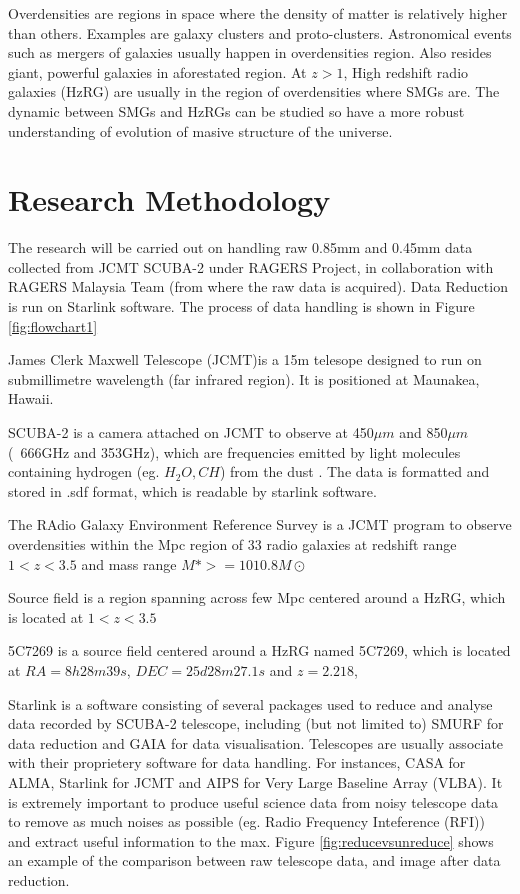 \documentclass{article}
\begin{document}
\noindent Overdensities are regions in space where the density of matter is relatively higher than others. Examples are galaxy clusters and proto-clusters. Astronomical events such as mergers of galaxies usually happen in overdensities region. Also resides giant, powerful galaxies in aforestated region. At $z>1$, High redshift radio galaxies (HzRG) are usually in the region of overdensities where SMGs are. The dynamic between SMGs and HzRGs can be studied so have a more robust understanding of evolution of masive structure of the universe.\parencite{Saxena2018}

\section{Research Methodology}

The research will be carried out on handling raw 0.85mm and 0.45mm data collected from JCMT SCUBA-2 under RAGERS Project, in collaboration with RAGERS Malaysia Team (from where the raw data is acquired). Data Reduction is run on Starlink software. The process of data handling is shown in Figure \ref{fig:flowchart1}
\medskip

\noindent James Clerk Maxwell Telescope (JCMT)is a 15m telesope designed to run on submillimetre wavelength (far infrared region). It is positioned at Maunakea, Hawaii.
\medskip

\noindent SCUBA-2 is a camera attached on JCMT to observe at 450$\mu m$ and 850$\mu m$ (~666GHz and 353GHz), which are frequencies emitted by light molecules containing hydrogen (eg. $H_2O,CH$) from the dust \parencite{Phillips2013}. The data is formatted and stored in .sdf format, which is readable by starlink software.
\medskip

\noindent The RAdio Galaxy Environment Reference Survey is a JCMT program to observe overdensities within the Mpc region of 33 radio galaxies at redshift range $1 < z < 3.5$ and mass range $M\ast >=1010.8M\odot $ \parencite{Ragers2021}
\medskip

\noindent Source field is a region spanning across few Mpc centered around a HzRG, which is located at $1 < z < 3.5$ 
\medskip

\noindent 5C7269 is a source field centered around a HzRG named 5C7269, which is located at $RA = 8h28m39s$, $DEC = 25d28m27.1s$ and $z = 2.218$, 
\medskip

\noindent Starlink is a software consisting of several packages used to reduce and analyse data recorded by SCUBA-2 telescope, including (but not limited to) SMURF for data reduction and GAIA for data visualisation. Telescopes are usually associate with their proprietery software for data handling. For instances, CASA for ALMA, Starlink for JCMT and AIPS for Very Large Baseline Array (VLBA). It is extremely important to produce useful science data from noisy telescope data to remove as much noises as possible (eg. Radio Frequency Inteference (RFI)) and extract useful information to the max. Figure \ref{fig:reducevsunreduce} shows an example of the comparison between raw telescope data, and image after data reduction.
\end{document}
